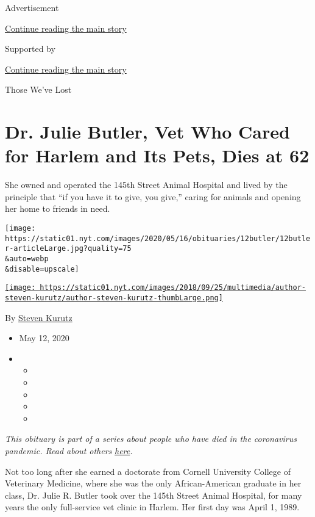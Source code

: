 Advertisement

\protect\hyperlink{after-top}{Continue reading the main story}

Supported by

\protect\hyperlink{after-sponsor}{Continue reading the main story}

Those We've Lost

\hypertarget{dr-julie-butler-vet-who-cared-for-harlem-and-its-pets-dies-at-62}{%
\section{Dr. Julie Butler, Vet Who Cared for Harlem and Its Pets, Dies
at
62}\label{dr-julie-butler-vet-who-cared-for-harlem-and-its-pets-dies-at-62}}

She owned and operated the 145th Street Animal Hospital and lived by the
principle that ``if you have it to give, you give,'' caring for animals
and opening her home to friends in need.

\texttt{[image: https://static01.nyt.com/images/2020/05/16/obituaries/12butler/12butler-articleLarge.jpg?quality=75\\\&auto=webp\\\&disable=upscale]}

\href{https://www.nytimes.com/by/steven-kurutz}{\texttt{[image: https://static01.nyt.com/images/2018/09/25/multimedia/author-steven-kurutz/author-steven-kurutz-thumbLarge.png]}}

By \href{https://www.nytimes.com/by/steven-kurutz}{Steven Kurutz}

\begin{itemize}
\item
  May 12, 2020
\item
  \begin{itemize}
  \item
  \item
  \item
  \item
  \item
  \end{itemize}
\end{itemize}

\emph{This obituary is part of a series about people who have died in
the coronavirus pandemic. Read about others}
\href{https://www.nytimes.com/series/people-who-have-died-of-the-coronavirus}{\emph{here}}\emph{.}

Not too long after she earned a doctorate from Cornell University
College of Veterinary Medicine, where she was the only African-American
graduate in her class, Dr. Julie R. Butler took over the 145th Street
Animal Hospital, for many years the only full-service vet clinic in
Harlem. Her first day was April 1, 1989.

